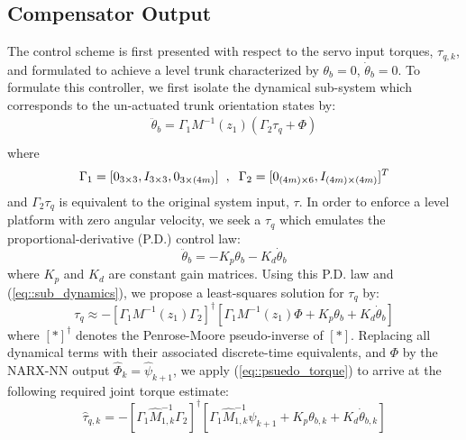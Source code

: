 \subsection{Compensator Output}


The control scheme is first presented with respect to the servo input torques, $\tau_{q,k}$, %
and formulated to achieve a level trunk characterized by $\theta_{b}=0$, $\dot{\theta}_{b}= 0$. To formulate this controller, 
we first isolate the dynamical sub-system which corresponds to the un-actuated trunk orientation states by:
	\begin{equation}
		\begin{split}
		\ddot{\theta}_{b} 	= \Gamma_{1} M^{-1}(z_{1})( \Gamma_{2}\tau_{q}	 + \Phi) \\
		\end{split}	
		\label{eq::sub_dynamics}
	\end{equation}
where 
	\begin{equation*}
		\Gamma_{1} = [0_{3\times3},I_{3\times3},0_{3\times(4m)}] 
		\hspace{2mm},\hspace{2mm} 
		\Gamma_{2} = [0_{(4m)\times6},I_{(4m)\times(4m)}]^{T}
	\end{equation*}
and $\Gamma_{2}\tau_{q}$ is equivalent to the original system input, $\tau$.
In order to enforce a level platform with zero angular velocity, we seek a $\tau_{q}$ which emulates
the proportional-derivative (P.D.) control law:
	\begin{equation}
	 	\ddot{\theta}_{b} = - K_{p}{\theta}_{b} - K_{d}\dot{\theta}_{b}
	\end{equation}
where $K_{p}$ and $K_{d}$ are constant gain matrices. Using this P.D. law and (\ref{eq::sub_dynamics}), 
we propose a least-squares solution for $\tau_{q}$ by:
	\begin{equation}
		\tau_{q} \approx  -
		\left[\Gamma_{1} M^{-1}(z_{1}) \Gamma_{2}\right]^{\dagger}
		\left[\Gamma_{1} M^{-1}(z_{1}) \Phi + K_{p}{\theta}_{b} + K_{d}\dot{\theta}_{b} \right]
		\label{eq::psuedo_torque}
	\end{equation}
where $\left[*\right]^{\dagger}$ denotes the Penrose-Moore pseudo-inverse of $[*]$.
Replacing all dynamical terms with their associated discrete-time equivalents, and $\Phi$ by 
the NARX-NN output $\hat{\Phi}_{k}=\hat{\psi}_{k+1}$, we apply (\ref{eq::psuedo_torque})
 to arrive at the following required joint torque estimate:
	\begin{equation}
		\hat{\tau}_{q,k} =  -
		\left[\Gamma_{1} \hat{M}^{-1}_{1,k} \Gamma_{2}\right]^{\dagger} 
		\left[\Gamma_{1}\hat{M}^{-1}_{1,k}\hat{\psi}_{k+1} + K_{p}{\theta}_{b,k} + K_{d}\dot{\theta}_{b,k} \right]
		\label{eq::psuedo_torque_k}
	\end{equation}
